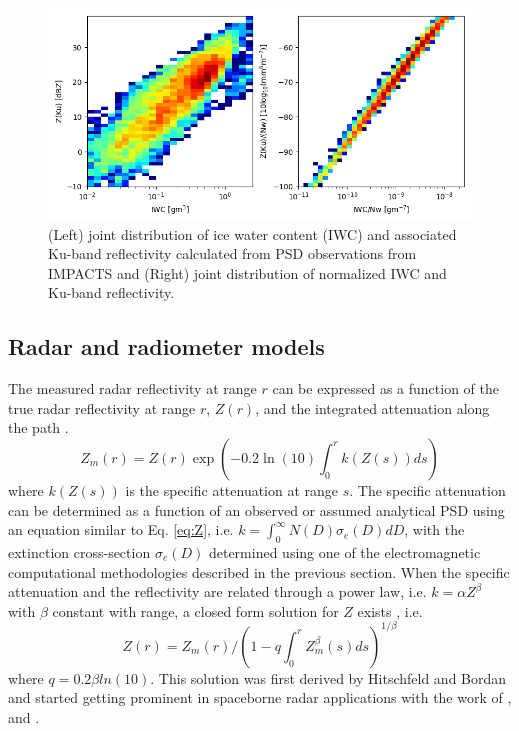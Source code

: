 \documentclass[10pt]{ietbook}
\begin{document}
\begin{figure} 
\centerline{ }
\includegraphics[width=\textwidth]{normZvsnormIWC.png}

\caption{ (Left) joint distribution of ice water content (IWC) and associated Ku-band reflectivity calculated from PSD observations from IMPACTS and
(Right) joint distribution of normalized IWC and Ku-band reflectivity. }
\label{fig:normZ}
\end{figure}

\subsection{Radar and radiometer models}
The measured radar reflectivity at range $r$ can be expressed as a function of the true radar reflectivity at range $r$, $Z(r)$, and the integrated attenuation
along the path \cite{iguchi_meneghini_1994}.
\begin{equation}\label{eq:radarEq}
Z_m(r)=Z(r) \exp(-0.2\ln(10)\int_0^r k(Z(s))ds)
\end{equation}
where $k(Z(s))$ is the specific attenuation at range $s$.  The specific attenuation can be determined as a function of an observed or assumed analytical PSD
using an equation similar to Eq. \ref{eq:Z}, i.e. $k=\int_0^{\infty} N(D) \sigma_e(D)dD$, with the extinction cross-section $\sigma_e(D)$ determined using one of
the electromagnetic computational methodologies described in the previous section.  When the specific attenuation and the reflectivity are related through a 
power law, i.e. $k=\alpha Z^\beta$ with $\beta$ constant with range, a closed form solution for $Z$ exists \cite{iguchi_meneghini_1994}, i.e.
\begin{equation}\label{eq:hbsol}
Z(r)=Z_m(r) /(1-q\int_0^r Z_m^\beta(s)ds)^{1/\beta}
\end{equation}
where $q=0.2\beta ln(10)$.  This solution was first derived by Hitschfeld and Bordan \cite{hitschfeld1954} and started
getting prominent in spaceborne radar applications with the work of \cite{meneghini1983}, \cite{marzoug1991} 
and \cite{iguchi_meneghini_1994}.
\end{document}
